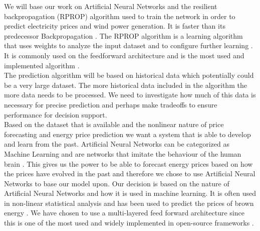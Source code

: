 We will base our work on Artificial Neural Networks and the resilient backpropagation (RPROP) algorithm used to train the network in order to predict electricity prices and wind power generation. It is faster than its predecessor Backpropagation \cite{8,15}.  The RPROP algorithm is a learning algorithm that uses weights to analyze the input dataset and to configure further learning \cite{17}. It is commonly used on the feedforward architecture and is the most used and implemented algorithm \cite{14,17}.
\\[0.5cm] 
The prediction algorithm will be based on historical data which potentially could be a very large dataset. The more historical data included in the algorithm the more data needs to be processed. We need to investigate how much of this data is necessary for precise prediction and perhaps make tradeoffs to ensure performance for decision support.
\\[0.5cm]
Based on the dataset that is available and the nonlinear nature of price forecasting and energy price prediction we want a system that is able to develop and learn from the past. Artificial Neural Networks can be categorized as Machine Learning \cite{18} and are networks that imitate the behaviour of the human brain \cite{1}. This gives us the power to be able to forecast energy prices based on how the prices have evolved in the past and therefore we chose to use Artificial Neural Networks to base our model upon. Our decision is based on the nature of Artificial Neural Networks and how it is used in machine learning. It is often used in non-linear statistical analysis \cite{16} and has been used to predict the prices of brown energy \cite{2,3}. We have chosen to use a multi-layered feed forward architecture since this is one of the most used and widely implemented in open-source frameworks \cite{17}.